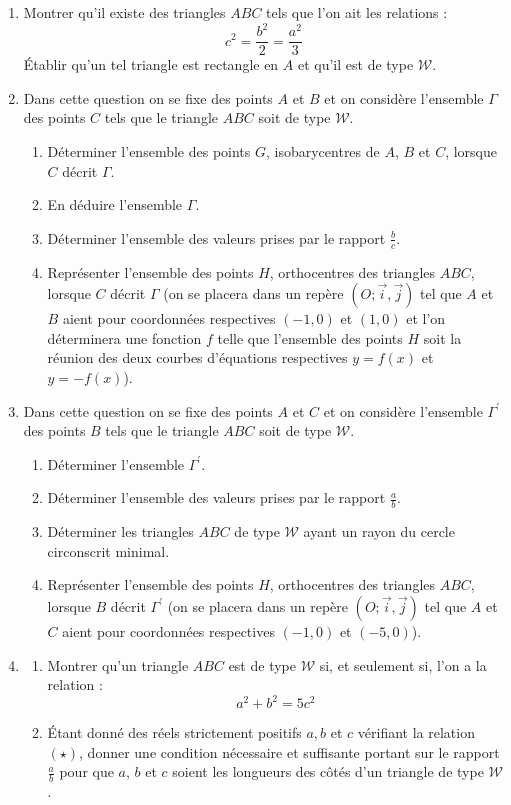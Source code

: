 \documentclass[landscape,twocolumn,leqno,a4paper,10pt]{report} %
\begin{document}
\begin{enumerate}
	\item Montrer qu'il existe des triangles $A B C$ tels que l'on ait les relations :
	$$c^{2}=\frac{b^{2}}{2}=\frac{a^{2}}{3}$$
	Établir qu'un tel triangle est rectangle en $A$ et qu'il est de type $\mathscr{W}$.
	\item Dans cette question on se fixe des points $A$ et $B$ et on considère l'ensemble $\Gamma$ des points $C$ tels que le triangle $A B C$ soit de type $\mathscr{W}$.
	\begin{enumerate}
		\item Déterminer l'ensemble des points $G$, isobarycentres de $A$, $B$ et $C$, lorsque $C$ décrit $\Gamma$.
		\item En déduire l'ensemble $\Gamma$. 
		\item Déterminer l'ensemble des valeurs prises par le rapport $\frac{b}{c}$.
		\item Représenter l'ensemble des points $H$, orthocentres des triangles $A B C$, lorsque $C$ décrit $\Gamma$ (on se placera dans un repère $(O ; \vec{i}, \vec{j})$ tel que $A$ et $B$ aient pour coordonnées respectives $(-1,0)$ et $(1,0)$ et l'on déterminera une fonction $f$ telle que l'ensemble des points $H$ soit la réunion des deux courbes d'équations respectives $y=f(x)$ et $y=-f(x)$).
	\end{enumerate}
	\item Dans cette question on se fixe des points $A$ et $C$ et on considère l'ensemble $\Gamma^{\prime}$ des points $B$ tels que le triangle $A B C$ soit de type $\mathscr{W}$.
	\begin{enumerate}
		\item Déterminer l'ensemble $\Gamma^{\prime}$.
		\item Déterminer l'ensemble des valeurs prises par le rapport $\frac{a}{b}$.
		\item Déterminer les triangles $A B C$ de type $\mathscr{W}$ ayant un rayon du cercle circonscrit minimal.
		\item Représenter l'ensemble des points $H$, orthocentres des triangles $A B C$, lorsque $B$ décrit $\Gamma^{\prime}$ (on se placera dans un repère $(O ; \vec{i}, \vec{j})$ tel que $A$ et $C$ aient pour coordonnées respectives $(-1,0)$ et $(-5,0)$).
	\end{enumerate}
	\item \begin{enumerate}
		\item Montrer qu'un triangle $A B C$ est de type $\mathscr{W}$ si, et seulement si, l'on a la relation :
		\begin{equation}\tag{$\star$}
		a^{2}+b^{2}=5 c^{2}
		\end{equation}
		\item Étant donné des réels strictement positifs $a, b$ et $c$ vérifiant la relation $(\star)$, donner une condition nécessaire et suffisante portant sur le rapport $\frac{a}{b}$ pour que $a$, $b$ et $c$ soient les longueurs des côtés d'un triangle de type $\mathscr{W}$.
	\end{enumerate}
\end{enumerate}
\end{document}
